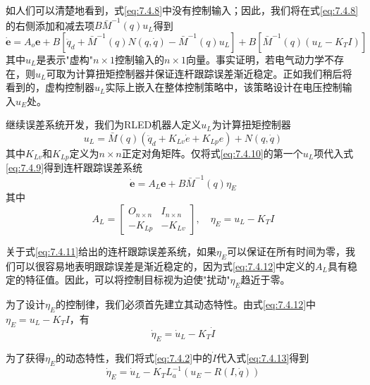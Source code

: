 \documentclass[UTF8]{ctexart}
\begin{document}
如人们可以清楚地看到，式\eqref{eq:7.4.8}中没有控制输入；因此，我们将在式\eqref{eq:7.4.8}的右侧添加和减去项$B\bar{M}^{-1}(q)u_L$得到
\begin{equation}\label{eq:7.4.9}
\dot{\mathbf{e}} = A_o \mathbf{e} + B\left[\ddot{q}_d + \bar{M}^{-1}(q)N(q,\dot{q}) - \bar{M}^{-1}(q)u_L\right] + B\left[\bar{M}^{-1}(q)(u_L - K_T I)\right]
\end{equation}
其中$u_L$是表示"虚构"$n \times 1$控制输入的$n \times 1$向量。事实证明，若电气动力学不存在，则$u_L$可取为计算扭矩控制器并保证连杆跟踪误差渐近稳定。正如我们稍后将看到的，虚构控制器$u_L$实际上嵌入在整体控制策略中，该策略设计在电压控制输入$u_E$处。

继续误差系统开发，我们为RLED机器人定义$u_L$为计算扭矩控制器
\begin{equation}\label{eq:7.4.10}
u_L = \bar{M}(q)(\ddot{q}_d + K_{Lv}\dot{e} + K_{Lp}e) + N(q,\dot{q})
\end{equation}
其中$K_{Lv}$和$K_{Lp}$定义为$n \times n$正定对角矩阵。仅将式\eqref{eq:7.4.10}的第一个$u_L$项代入式\eqref{eq:7.4.9}得到连杆跟踪误差系统
\begin{equation}\label{eq:7.4.11}
\dot{\mathbf{e}} = A_L \mathbf{e} + B\bar{M}^{-1}(q)\eta_E
\end{equation}
其中
\begin{equation}\label{eq:7.4.12}
A_L = \begin{bmatrix} O_{n \times n} & I_{n \times n} \\ -K_{Lp} & -K_{Lv} \end{bmatrix}, \quad \eta_E = u_L - K_T I
\end{equation}

关于式\eqref{eq:7.4.11}给出的连杆跟踪误差系统，如果$\eta_E$可以保证在所有时间为零，我们可以很容易地表明跟踪误差是渐近稳定的，因为式\eqref{eq:7.4.12}中定义的$A_L$具有稳定的特征值。因此，可以将控制目标视为迫使"扰动"$\eta_E$趋近于零。

为了设计$\eta_E$的控制律，我们必须首先建立其动态特性。由式\eqref{eq:7.4.12}中$\eta_E = u_L - K_T I$，有
\begin{equation}\label{eq:7.4.13}
\dot{\eta}_E = \dot{u}_L - K_T \dot{I}
\end{equation}

为了获得$\eta_E$的动态特性，我们将式\eqref{eq:7.4.2}中的$\dot{I}$代入式\eqref{eq:7.4.13}得到
\begin{equation}\label{eq:7.4.14}
\dot{\eta}_E = \dot{u}_L - K_T L_a^{-1}(u_E - R(I,\dot{q}))
\end{equation}
\end{document}
